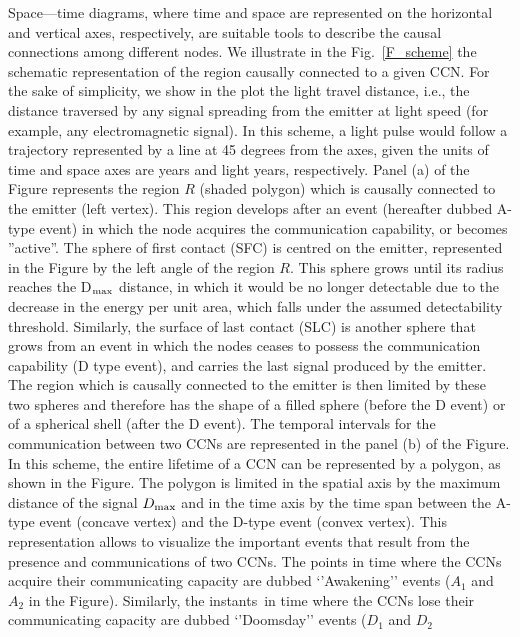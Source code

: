 \documentclass[crop]{CSLB}
\newcommand{\ceti}{CCN}
\newcommand{\cetis}{CCNs}
\newcommand{\ffn}[1]{}
\begin{document}
\ffn{1} Space—time diagrams, where time and space are represented on
the horizontal and vertical axes, respectively, are suitable tools to
describe the causal connections among different nodes.
%
We illustrate in the Fig.~\ref{F_scheme} the schematic representation
of the region causally connected to a given \ceti{}.
%
For the sake of simplicity, we show in the plot the light travel
distance, i.e., the distance traversed by any signal spreading from
the emitter at light speed (for example, any electromagnetic signal).
%
In this scheme, a light pulse would follow a trajectory represented by
a line at 45 degrees from the axes, given the units of time and
space axes are years and light years, respectively.
%
Panel (a) of the Figure represents the region $R$ (shaded polygon)
which is causally connected to the emitter (left vertex).
%
This region develops after an event (hereafter dubbed A-type event) in
which the node acquires the communication capability, or becomes
''active''.
%
The sphere of first contact (SFC) is centred on the emitter,
represented in the Figure by the left angle of the region $R$.
%
This sphere grows until its radius reaches the D$_{\rm max}$ distance, in
which it would be no longer detectable due to the decrease in the
energy per unit area, which falls under the assumed detectability
threshold.
%
Similarly, the surface of last contact (SLC) is another sphere that
grows from an event in which the nodes ceases to possess the
communication capability (D type event), and carries the last signal
produced by the emitter.
%
The region which is causally connected to the emitter is then limited
by these two spheres and therefore has the shape of a filled sphere
(before the D event) or of a spherical shell (after the D event).
%
The temporal intervals for the communication between two \cetis{} are
represented in the panel (b) of the Figure.
%
In this scheme, the entire lifetime of a \ceti{} can be represented by
a polygon, as shown in the Figure.
%
The polygon is limited in the spatial axis by the maximum distance of
the signal $D_{\rm max}$ and in the time axis by the time span between the
A-type event (concave vertex) and the D-type event (convex vertex).
%
This representation allows to visualize the important events that
result from the presence and communications of two \cetis{}.
%
The points in time where the \cetis{} acquire their communicating
capacity are dubbed ‘’Awakening’’ events ($A_1$ and $A_2$ in the
Figure).
%
Similarly, the instants in time where the \cetis{} lose their
communicating capacity are dubbed ‘’Doomsday’’ events ($D_1$ and $D_2$
\end{document}
